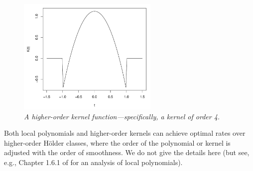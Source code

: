 \documentclass{article}
\begin{document}
\begin{figure}[tb]
\centering
\includegraphics[width=0.6\textwidth]{order4.pdf}
\caption{\it A higher-order kernel function---specifically, a kernel of order
  4.}    
\label{fig:order4}
\end{figure}

Both local polynomials and higher-order kernels can achieve optimal rates over
higher-order H{\"older} classes, where the order of the polynomial or kernel is
adjusted with the order of smoothness. We do not give the details here (but see, 
e.g., Chapter 1.6.1 of \citet{tsybakov2009introduction} for an analysis of local 
polynomials). 



\end{document}
